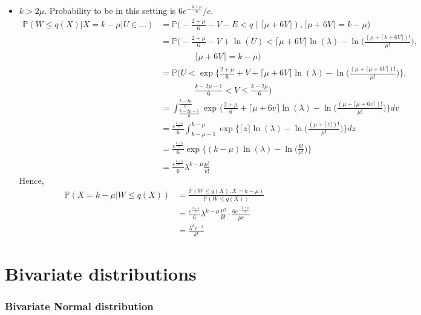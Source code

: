 \documentclass[a4paper,11pt]{article}
\theoremstyle{plain}
\theoremstyle{definition}
\newcommand{\MP}{\mathbb{P}}
\begin{document}
\begin{itemize}
		
		\item $k > 2\mu$. Probability to be in this setting is $6e^{-\frac{2+\mu}{6}} / c$.
		\[
		\begin{aligned}
		\MP(W \leq q(X) | X = k - \mu | U \in ...) &= \MP\Big(-\frac{2 + \mu}{6} - V - E < q( \lceil \mu + 6V \rceil ), \lceil \mu + 6V \rceil = k - \mu \Big)  \\
		& = \MP\Bigg(-\frac{2 + \mu}{6} - V + \ln(U) < \lceil \mu + 6V \rceil \ln(\lambda) - \ln \bigg( \frac{(\mu + \lceil \lambda + 6V \rceil)!}{\mu!} \bigg),\\
		& \qquad \qquad \lceil \mu + 6V \rceil = k - \mu \Bigg) \\
		& =	\MP \Bigg( U < \exp\bigg\{\frac{2 + \mu}{6} + V + \lceil \mu + 6V \rceil \ln(\lambda) - \ln \bigg( \frac{(\mu + \lceil \mu + 6V \rceil)!}{\mu!} \bigg) \bigg\},\\
		& \qquad \qquad \frac{k - 2\mu - 1}{6} < V \leq \frac{k - 2\mu}{6} \Bigg) \\
		& = \int_{\frac{k - 2\mu - 1}{6}}^{\frac{k - 2\mu}{6}} \exp\bigg\{\frac{2 + \mu}{6} + \lceil \mu + 6v \rceil \ln(\lambda) - \ln \bigg( \frac{(\mu + \lceil \mu + 6v \rceil)!}{\mu!} \bigg) \bigg\} dv \\
		& = \frac{ e^{\frac{2+\lambda}{6}}}{6} \int_{k-\mu-1}^{k-\mu} \exp\bigg\{\lceil z \rceil \ln(\lambda) - \ln \bigg( \frac{(\mu + \lceil z \rceil)!}{\mu!} \bigg) \bigg\} dz \\
		& = \frac{ e^{\frac{2+\lambda}{6}}}{6} \exp\bigg\{(k-\mu) \ln(\lambda) - \ln \bigg( \frac{k!}{\mu!} \bigg) \bigg\} \\
		& = \frac{ e^{\frac{2+\lambda}{6}}}{6} \lambda^{k-\mu} \frac{\mu!}{k!}
		\end{aligned} 
		\]
		Hence,
		\[ 
		\begin{aligned}
		\MP(X = k - \mu | W \leq q(X)) &= \frac{\MP(W \leq q(X), X = k-\mu)}{\MP(W \leq q(X))} \\
		& = \frac{ e^{\frac{2+\lambda}{6}}}{6} \lambda^{k-\mu} \frac{\mu!}{k!} \cdot \frac{6e^{-\frac{2+\mu}{6}}}{pc}\\
		& = \frac{\lambda^k e^{-\lambda}}{k!}
		\end{aligned} 
		\]
		
	\end{itemize}
	\pagebreak
	\part{Bivariate distributions}
	\section{Bivariate Normal distribution}
\end{document}

